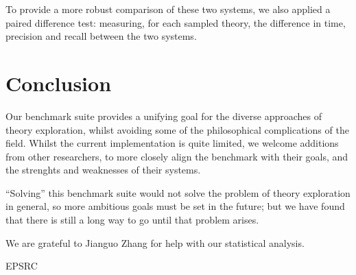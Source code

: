 To provide a more robust comparison of these two systems, we also applied a
paired difference test: measuring, for each sampled theory, the difference in
time, precision and recall between the two systems.

\section{Conclusion}
\label{sec:conclusion}

Our benchmark suite provides a unifying goal for the diverse approaches of
theory exploration, whilst avoiding some of the philosophical complications of
the field. Whilst the current implementation is quite limited, we welcome
additions from other researchers, to more closely align the benchmark with their
goals, and the strenghts and weaknesses of their systems.

``Solving'' this benchmark suite would not solve the problem of theory exploration in general,
so more ambitious goals must be set in the future; but we have found that there is still a
long way to go until that problem arises.

\begin{acknowledgements}
  We are grateful to Jianguo Zhang for help with our statistical analysis.

  EPSRC
\end{acknowledgements}





